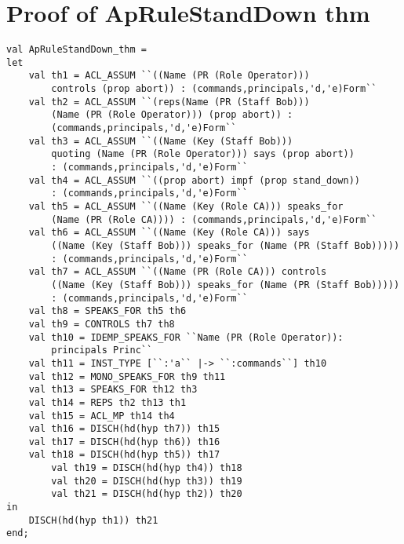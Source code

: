 \documentclass{report}
\begin{document}
\section{Proof of ApRuleStandDown thm}
\label{proof-14-4-1-D}
\begin{lstlisting}[frame=TBlr]
val ApRuleStandDown_thm =
let
	val th1 = ACL_ASSUM ``((Name (PR (Role Operator))) 
        controls (prop abort)) : (commands,principals,'d,'e)Form``
 	val th2 = ACL_ASSUM ``(reps(Name (PR (Staff Bob))) 
        (Name (PR (Role Operator))) (prop abort)) : 
        (commands,principals,'d,'e)Form``
 	val th3 = ACL_ASSUM ``((Name (Key (Staff Bob))) 
        quoting (Name (PR (Role Operator))) says (prop abort)) 
        : (commands,principals,'d,'e)Form``
 	val th4 = ACL_ASSUM ``((prop abort) impf (prop stand_down)) 
        : (commands,principals,'d,'e)Form``
 	val th5 = ACL_ASSUM ``((Name (Key (Role CA))) speaks_for 
        (Name (PR (Role CA)))) : (commands,principals,'d,'e)Form``
 	val th6 = ACL_ASSUM ``((Name (Key (Role CA))) says 
        ((Name (Key (Staff Bob))) speaks_for (Name (PR (Staff Bob))))) 
        : (commands,principals,'d,'e)Form``
 	val th7 = ACL_ASSUM ``((Name (PR (Role CA))) controls 
        ((Name (Key (Staff Bob))) speaks_for (Name (PR (Staff Bob))))) 
        : (commands,principals,'d,'e)Form``
 	val th8 = SPEAKS_FOR th5 th6
 	val th9 = CONTROLS th7 th8
 	val th10 = IDEMP_SPEAKS_FOR ``Name (PR (Role Operator)): 
        principals Princ``
 	val th11 = INST_TYPE [``:'a`` |-> ``:commands``] th10
 	val th12 = MONO_SPEAKS_FOR th9 th11
 	val th13 = SPEAKS_FOR th12 th3
 	val th14 = REPS th2 th13 th1
 	val th15 = ACL_MP th14 th4
 	val th16 = DISCH(hd(hyp th7)) th15
 	val th17 = DISCH(hd(hyp th6)) th16
 	val th18 = DISCH(hd(hyp th5)) th17
     	val th19 = DISCH(hd(hyp th4)) th18
     	val th20 = DISCH(hd(hyp th3)) th19
     	val th21 = DISCH(hd(hyp th2)) th20
in
	DISCH(hd(hyp th1)) th21
end;
\end{lstlisting}
\end{document}
